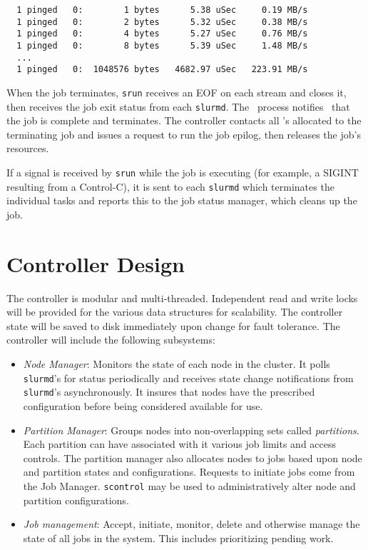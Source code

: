 \begin{verbatim}
  1 pinged   0:        1 bytes      5.38 uSec     0.19 MB/s                     
  1 pinged   0:        2 bytes      5.32 uSec     0.38 MB/s                     
  1 pinged   0:        4 bytes      5.27 uSec     0.76 MB/s                     
  1 pinged   0:        8 bytes      5.39 uSec     1.48 MB/s                     
  ...
  1 pinged   0:  1048576 bytes   4682.97 uSec   223.91 MB/s              
\end{verbatim}

When the job terminates, {\tt srun} receives an EOF on each stream and
closes it, then receives the job exit status from each {\tt slurmd}.
The \srun\ process notifies \slurmctld\ that the job is complete 
and terminates. The controller contacts all \slurmd 's allocated to the
terminating job and issues a request to run the job epilog, then releases
the job's resources.

If a signal is received by {\tt srun} while the job is executing (for example,
a SIGINT resulting from a Control-C), it is sent to each {\tt slurmd} which 
terminates the individual tasks and reports this to the job status manager,
which cleans up the job.

\section{Controller Design}

The controller is modular and multi-threaded.  Independent read
and write locks will be provided for the various data structures for
scalability.  The controller state will be saved to disk immediately
upon change for fault tolerance.  The controller  will include the
following subsystems:

\begin{itemize}
\item {\em Node Manager}: Monitors the state of each node in
the cluster.  It polls {\tt slurmd}'s for status periodically and
receives state change notifications from {\tt slurmd}'s asynchronously.
It insures that nodes have the prescribed configuration before being 
considered available for use.

\item {\em Partition Manager}: Groups nodes into non-overlapping sets called
{\em partitions}. Each partition can have associated with it various job
limits and access controls.  The partition manager also allocates nodes
to jobs based upon node and partition states and configurations. Requests
to initiate jobs come from the Job Manager.  {\tt scontrol} may be used
to administratively alter node and partition configurations.

\item {\em Job management}: Accept, initiate, monitor, delete and
otherwise manage the state of all jobs in the system. This includes
prioritizing pending work.


\end{itemize}

